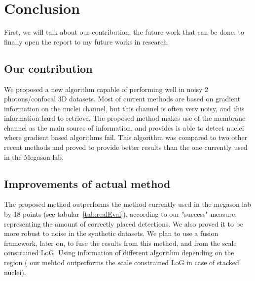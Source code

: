
\chapter{Conclusion}

First, we will talk about our contribution, the future work that can be done, to finally open the report to my future works in research.

%
%
%
%




\section{Our contribution}

We proposed a new algorithm capable of performing well in noisy 2 photons/confocal 3D datasets.
Most of current methods are based on gradient information on the nuclei channel, but this channel is often very noisy, and this information hard to retrieve.
The proposed method makes use of the membrane channel as the main source of information,
and provides is able to detect nuclei where gradient based\cite{al2009improved} algorithms fail. 
This algorithm was compared to two other recent methods and proved to provide better results than the one currently used in the Megason lab.


\section{Improvements of actual method}

The proposed method outperforms the method currently used in the megason lab by 18 points
(see tabular~\ref{tab:realEval}), according to our "success" measure, representing the amount of correctly placed detections.
We also proved it to be more robust to noise in the synthetic datasets.
We plan to use a fusion framework, later on, to fuse the results from this method, and from the scale constrained LoG. Using information of different algorithm depending on the region ( our mehtod outperforms the scale constrained LoG in case of stacked nuclei).


